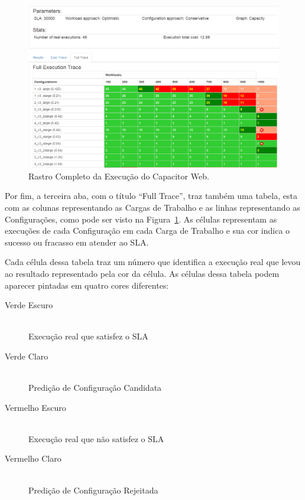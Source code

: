 \begin{figure}[t]
  \begin{center}
    \includegraphics[width=\linewidth]{img/CapacitorWeb_FullTrace}
  \end{center}
  \caption{\label{fig:capacitor_web_fulltrace}Rastro Completo da Execução do Capacitor Web.}
\end{figure}

Por fim, a terceira aba, com o título ``Full Trace'', traz também uma tabela, 
esta com as colunas representando as Cargas de Trabalho e as linhas representando
as Configurações, como pode ser visto na Figura~\ref{fig:capacitor_web_fulltrace}. 
As células representam as execuções de cada Configuração em cada Carga de Trabalho 
e sua cor indica o sucesso ou fracasso em atender ao SLA.

Cada célula dessa tabela traz um número que identifica a execução real que levou
ao resultado representado pela cor da célula. As células dessa tabela podem aparecer
pintadas em quatro cores diferentes:

\begin{description}
  \item[Verde Escuro] \hfill \\ Execução real que satisfez o SLA
  \item[Verde Claro] \hfill \\ Predição de Configuração Candidata
  \item[Vermelho Escuro] \hfill \\ Execução real que não satisfez o SLA
  \item[Vermelho Claro] \hfill \\ Predição de Configuração Rejeitada
\end{description}

